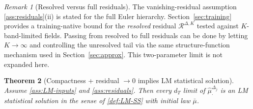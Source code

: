 \documentclass{article}
\numberwithin{equation}{section}
\theoremstyle{plain}
\newtheorem{theorem}{Theorem}[section]
\theoremstyle{definition}
\theoremstyle{remark}
\newtheorem{remark}[theorem]{Remark}
\begin{document}
\begin{remark}[Resolved versus full residuals]
The vanishing-residual assumption \cref{ass:residuals}(ii) is stated for the full Euler hierarchy.
Section~\ref{sec:training} provides a training-native bound for the \emph{resolved} residual
$\mathcal R^{\Delta,K}$ tested against $K$-band-limited fields. Passing from resolved to full residuals can be done
by letting $K\to\infty$ and controlling the unresolved tail via the same structure-function mechanism used in
Section~\ref{sec:approx}. This two-parameter limit is not expanded here.
\end{remark}




\begin{theorem}[Compactness + residual $\to0$ implies LM statistical solution]\label{thm:identify}
Assume \cref{ass:LM-inputs} and \cref{ass:residuals}. Then every $d_T$ limit of $\widehat\mu^{\Delta_j}_\cdot$ is an
LM statistical solution in the sense of \cref{def:LM-SS} with initial law $\bar\mu$.
\end{theorem}
\end{document}
